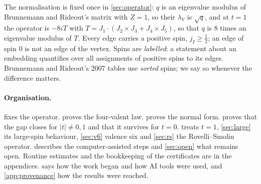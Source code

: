 The normalisation is fixed once in \cref{sec:operator}: $q$ is an eigenvalue modulus
of Brunnemann and Rideout's matrix with $Z=1$, so their $\lambda_V$ is $\sqrt q$, and
at $t=1$ the operator is $-8iT$ with $T=J_1\cdot(J_2\times J_3+J_4\times J_5)$, so that
$q$ is $8$ times an eigenvalue modulus of $T$. Every edge carries a positive spin,
$j_I\ge\frac12$; an edge of spin $0$ is not an edge of the vertex. Spins
are \emph{labelled}: a statement about an embedding quantifies over all assignments
of positive spins to its edges. Brunnemann and Rideout's 2007 tables use \emph{sorted} spins;
we say so whenever the difference matters.

\paragraph{Organisation.}
 fixes the operator.  proves the four-valent
law.  proves the normal form.  proves that
the gap closes for $|t|\ne0,1$ and that it survives for $t=0$.  treats
$t=1$, \cref{sec:large} its large-spin behaviour, \cref{sec:v6} valence six and
\cref{sec:rs} the Rovelli--Smolin operator.  describes the
computer-assisted steps and \cref{sec:open} what remains open. Routine estimates and
the bookkeeping of the certificates are in the appendices.  says how
the work began and how AI tools were used, and \cref{app:provenance} how the results were
reached.
